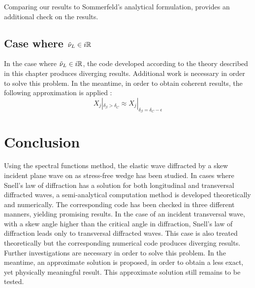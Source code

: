 Comparing our results to Sommerfeld's analytical formulation, provides an additional check on the results.

\subsection{Case where $\tilde{\nu}_L \in i\mathbb{R}$}
In the case where $\tilde{\nu}_L \in i\mathbb{R}$, the code developed according to the theory described in this chapter produces diverging results. Additional work is necessary in order to solve this problem. In the meantime, in order to obtain coherent results, the following approximation is applied :
\begin{equation}
X_j|_{\delta_{\beta}>\delta_C} \approx X_j|_{\delta_{\beta}=\delta_C-\epsilon}
\end{equation}

\section*{Conclusion}
Using the spectral functions method, the elastic wave diffracted by a skew incident plane wave on as stress-free wedge has been studied. In cases where Snell's law of diffraction has a solution for both longitudinal and transversal diffracted waves, a semi-analytical computation method is developed theoretically and numerically. The corresponding code has been checked in three different manners, yielding promising results. In the case of an incident transversal wave, with a skew angle higher than the critical angle in diffraction, Snell's law of diffraction leads only to transversal diffracted waves. This case is also treated theoretically but the corresponding numerical code produces diverging results. Further investigations are necessary in order to solve this problem. In the meantime, an approximate solution is proposed, in order to obtain a less exact, yet physically meaningful result. This approximate solution still remains to be tested.
